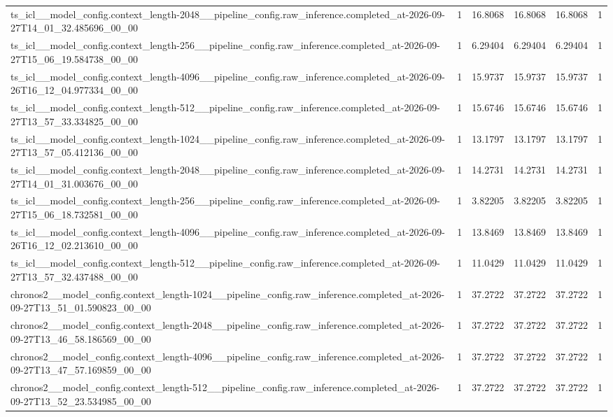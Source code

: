 \begin{tabular}{llllll}
ts\_icl\_\_model\_config.context\_length-2048\_\_pipeline\_config.raw\_inference.completed\_at-2026-09-27T14\_01\_32.485696\_00\_00 & 1 & 16.8068 & 16.8068 & 16.8068 & 1 \\
ts\_icl\_\_model\_config.context\_length-256\_\_pipeline\_config.raw\_inference.completed\_at-2026-09-27T15\_06\_19.584738\_00\_00 & 1 & 6.29404 & 6.29404 & 6.29404 & 1 \\
ts\_icl\_\_model\_config.context\_length-4096\_\_pipeline\_config.raw\_inference.completed\_at-2026-09-26T16\_12\_04.977334\_00\_00 & 1 & 15.9737 & 15.9737 & 15.9737 & 1 \\
ts\_icl\_\_model\_config.context\_length-512\_\_pipeline\_config.raw\_inference.completed\_at-2026-09-27T13\_57\_33.334825\_00\_00 & 1 & 15.6746 & 15.6746 & 15.6746 & 1 \\
ts\_icl\_\_model\_config.context\_length-1024\_\_pipeline\_config.raw\_inference.completed\_at-2026-09-27T13\_57\_05.412136\_00\_00 & 1 & 13.1797 & 13.1797 & 13.1797 & 1 \\
ts\_icl\_\_model\_config.context\_length-2048\_\_pipeline\_config.raw\_inference.completed\_at-2026-09-27T14\_01\_31.003676\_00\_00 & 1 & 14.2731 & 14.2731 & 14.2731 & 1 \\
ts\_icl\_\_model\_config.context\_length-256\_\_pipeline\_config.raw\_inference.completed\_at-2026-09-27T15\_06\_18.732581\_00\_00 & 1 & 3.82205 & 3.82205 & 3.82205 & 1 \\
ts\_icl\_\_model\_config.context\_length-4096\_\_pipeline\_config.raw\_inference.completed\_at-2026-09-26T16\_12\_02.213610\_00\_00 & 1 & 13.8469 & 13.8469 & 13.8469 & 1 \\
ts\_icl\_\_model\_config.context\_length-512\_\_pipeline\_config.raw\_inference.completed\_at-2026-09-27T13\_57\_32.437488\_00\_00 & 1 & 11.0429 & 11.0429 & 11.0429 & 1 \\
chronos2\_\_model\_config.context\_length-1024\_\_pipeline\_config.raw\_inference.completed\_at-2026-09-27T13\_51\_01.590823\_00\_00 & 1 & 37.2722 & 37.2722 & 37.2722 & 1 \\
chronos2\_\_model\_config.context\_length-2048\_\_pipeline\_config.raw\_inference.completed\_at-2026-09-27T13\_46\_58.186569\_00\_00 & 1 & 37.2722 & 37.2722 & 37.2722 & 1 \\
chronos2\_\_model\_config.context\_length-4096\_\_pipeline\_config.raw\_inference.completed\_at-2026-09-27T13\_47\_57.169859\_00\_00 & 1 & 37.2722 & 37.2722 & 37.2722 & 1 \\
chronos2\_\_model\_config.context\_length-512\_\_pipeline\_config.raw\_inference.completed\_at-2026-09-27T13\_52\_23.534985\_00\_00 & 1 & 37.2722 & 37.2722 & 37.2722 & 1 \\

\end{tabular}
